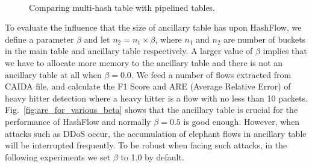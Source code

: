 \begin{figure}[ht!]
    \centering
    \mbox{
    }
    \caption{Comparing multi-hash table with pipelined tables.}
    \label{fig:performance_comparison_hierarchical_hashtable}
\end{figure}

To evaluate the influence that the size of ancillary table has upon HashFlow, we define a parameter $\beta$ and let $n_2=n_1\times\beta$, where $n_1$ and $n_2$ are number of buckets in the main table and ancillary table respectively. A larger value of $\beta$ implies that we have to allocate more memory to the ancillary table and there is not an ancillary table at all when $\beta=0.0$. We feed a number of flows extracted from CAIDA file, and calculate the F1 Score and ARE (Average Relative Error) of heavy hitter detection where a heavy hitter is a flow with no less than 10 packets. Fig.~\ref{fig:are_for_various_beta} shows that the ancillary table is crucial for the performance of HashFlow and normally $\beta=0.5$ is good enough. However, when attacks such as DDoS occur, the accumulation of elephant flows in ancillary table will be interrupted frequently. To be robust when facing such attacks, in the following experiments we  set $\beta$ to 1.0 by default.


